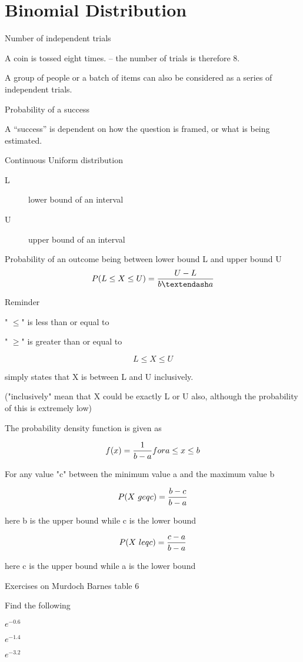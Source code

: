 \documentclass{beamer}
\begin{document}
\section{Binomial Distribution}
\begin{frame}	

	Number of independent trials
	
	A coin is tossed eight times. – the number of trials is therefore 8.
	
	A group of people or a batch of items can also be considered as a series of independent trials.
\end{frame}
\begin{frame} 
	Probability of a success
	
	A “success” is dependent on how the question is framed, or what is being estimated.

\end{frame}
\begin{frame}	
	Continuous Uniform distribution
	
\begin{description}
\item[L] lower bound of an interval
\item[U] upper bound of an interval
\end{description}
	Probability of an outcome being between lower bound L and upper bound U
	\[P( L \leq X \leq U)  =  { U - L \over  b – a }\]
\end{frame}
\begin{frame} 
	
	Reminder
	
	" $\leq$" is less than or equal to
	
	" $\geq$" is greater than or equal to
	
	
	\[L \leq X \leq U\]
	
	simply states that X is between L and U inclusively.
	
	("inclusively" mean that X could be exactly L or U also, although the probability of this is extremely low)
	
\end{frame}
\begin{frame} 
	The probability density function is given as
	
	\[f(x) = {1 \over b-a} for a \leq x \leq b\]
	
	For any value "c" between the minimum value a and the maximum value b
	
	\[P(X \ geq c) = {b-c \over b-a}\]
	
	here b is the upper bound while c is the lower bound
	
	
	\[P(X \ leq c) = {c-a \over b-a}\]
	
	here c is the upper bound while a is the lower bound
	
\end{frame}
\begin{frame}
	
	Exercises on Murdoch Barnes table 6
	
	Find the following
	
	$e^{-0.6}$
	
	$e^{-1.4}$
	
	$e^{-3.2}$
	
\end{frame}
\end{document}
